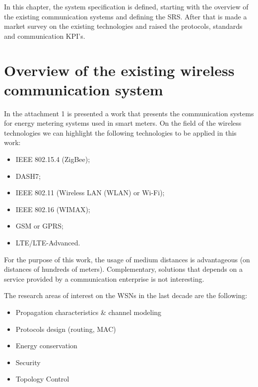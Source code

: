 
In this chapter, the system specification is defined, starting with the overview of the existing communication systems and defining the SRS. After that is made a market survey on the existing technologies and raised the protocols, standards and communication KPI's.



\section{Overview of the existing wireless communication system}
In the attachment 1 is presented a work that presents the communication systems for energy metering systems used in smart meters. On the field of the wireless technologies we can highlight the following technologies to be applied in this work:

\begin{itemize}
	\setlength\itemsep{-0.5em}
	\item IEEE 802.15.4 (ZigBee);
	\item DASH7;
	\item IEEE 802.11 (Wireless LAN (WLAN) or Wi-Fi);
	\item IEEE 802.16 (WIMAX);
	\item GSM or GPRS;
	\item LTE/LTE-Advanced.	
\end{itemize}

For the purpose of this work, the usage of medium distances is advantageous (on distances of hundreds of meters). Complementary, solutions that depends on a service provided by a communication enterprise is not interesting. 


The research areas of interest on the WSNs in the last decade are the following:

\begin{itemize}
	\setlength\itemsep{-0.5em}
	\item Propagation characteristics \& channel modeling
	\item Protocols design (routing, MAC)
	\item Energy conservation
	\item Security
	\item Topology Control

\end{itemize}


